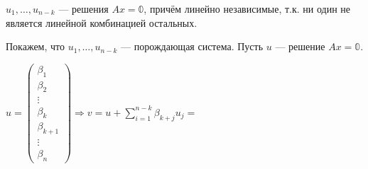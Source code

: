 \begin{itemize}
          \(u_1, \ldots, u_{n - k}\) --- решения \(Ax = \mathbb{0}\), причём линейно независимые, т.к. ни один не является линейной комбинацией остальных.

          Покажем, что \(u_1, \ldots, u_{n - k}\) --- порождающая система. Пусть \(u\) --- решение \(Ax = \mathbb{0}\).

          \(u =
          \begin{pmatrix}
              \beta_1       \\
              \beta_2       \\
              \vdots        \\
              \beta_k       \\
              \beta_{k + 1} \\
              \vdots        \\
              \beta_n
          \end{pmatrix} \Rightarrow v = u + \sum\limits_{i = 1}^{n - k} \beta_{k + j} u_j =\)


\end{itemize}
